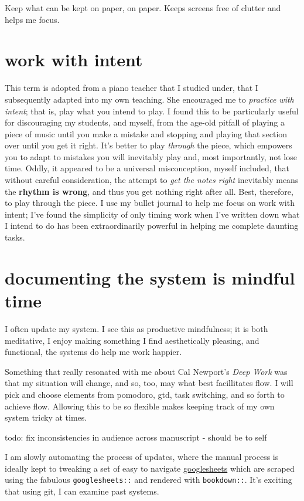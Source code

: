 \documentclass[]{book}
\begin{document}
Keep what can be kept on paper, on paper. Keeps screens free of clutter and helps me focus.

\hypertarget{work-with-intent}{%
\section{work with intent}\label{work-with-intent}}

This term is adopted from a piano teacher that I studied under, that I subsequently adapted into my own teaching. She encouraged me to \emph{practice with intent}; that is, play what you intend to play. I found this to be particularly useful for discouraging my students, and myself, from the age-old pitfall of playing a piece of music until you make a mistake and stopping and playing that section over until you get it right. It's better to play \emph{through} the piece, which empowers you to adapt to mistakes you will inevitably play and, most importantly, not lose time. Oddly, it appeared to be a universal misconception, myself included, that without careful consideration, the attempt to \emph{get the notes right} inevitably means the \textbf{rhythm is wrong}, and thus you get nothing right after all. Best, therefore, to play through the piece. I use my bullet journal to help me focus on work with intent; I've found the simplicity of only timing work when I've written down what I intend to do has been extraordinarily powerful in helping me complete daunting tasks.

\hypertarget{mindfulness}{%
\section{documenting the system is mindful time}\label{mindfulness}}

I often update my system. I see this as productive mindfulness; it is both meditative, I enjoy making something I find aesthetically pleasing, and functional, the systems do help me work happier.

Something that really resonated with me about Cal Newport's \emph{Deep Work} was that my situation will change, and so, too, may what best facillitates flow. I will pick and choose elements from pomodoro, gtd, task switching, and so forth to achieve flow. Allowing this to be so flexible makes keeping track of my own system tricky at times.

todo: fix inconsistencies in audience across manuscript - should be to self

I am slowly automating the process of updates, where the manual process is ideally kept to tweaking a set of easy to navigate \href{https://docs.google.com/spreadsheets/d/1hv7pkBGu8XQQOIBbBt1_1LvKGBR7zTdQYCzogrv3hz0/edit?usp=sharing}{googlesheets} which are scraped using the fabulous \texttt{googlesheets::} and rendered with \texttt{bookdown::}. It's exciting that using git, I can examine past systems.
\end{document}
